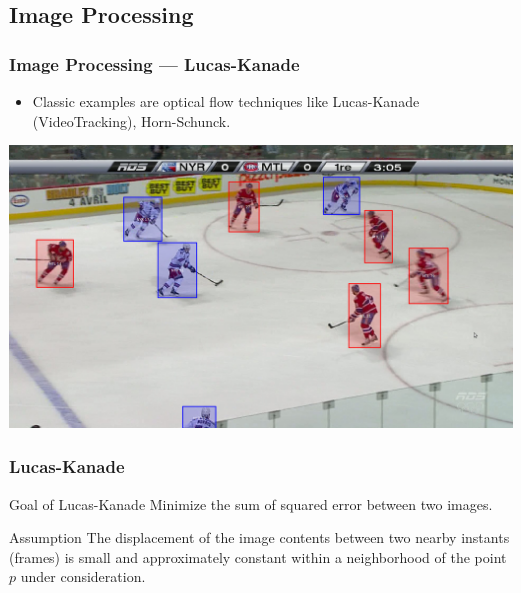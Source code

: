 





\subsection{Image Processing}

\begin{frame}
\frametitle{Image Processing --- Lucas-Kanade}
  \begin{itemize}
  \item[] {
Classic examples are optical flow techniques like Lucas-Kanade (VideoTracking), Horn-Schunck.
  }
  \end{itemize}


\includegraphics[scale=0.15]{right2.png}
\end{frame}

\begin{frame}
\frametitle{Lucas-Kanade}

\begin{blueblock}{Goal of Lucas-Kanade}
Minimize the sum of squared error between two images.
\end{blueblock}

\begin{redblock}{Assumption}
The displacement of the image contents between two nearby instants
(frames) is small and approximately constant within a neighborhood of
the point $p$ under consideration.
\end{redblock}

\end{frame}

